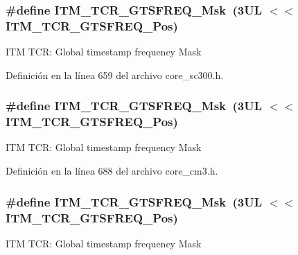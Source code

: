 \subsubsection[{\texorpdfstring{I\+T\+M\+\_\+\+T\+C\+R\+\_\+\+G\+T\+S\+F\+R\+E\+Q\+\_\+\+Msk}{ITM_TCR_GTSFREQ_Msk}}]{\setlength{\rightskip}{0pt plus 5cm}\#define I\+T\+M\+\_\+\+T\+C\+R\+\_\+\+G\+T\+S\+F\+R\+E\+Q\+\_\+\+Msk~(3\+U\+L $<$$<$ I\+T\+M\+\_\+\+T\+C\+R\+\_\+\+G\+T\+S\+F\+R\+E\+Q\+\_\+\+Pos)}\hypertarget{group___c_m_s_i_s___i_t_m_gade862cf009827f7f6748fc44c541b067}{}\label{group___c_m_s_i_s___i_t_m_gade862cf009827f7f6748fc44c541b067}
I\+TM T\+CR\+: Global timestamp frequency Mask 

Definición en la línea 659 del archivo core\+\_\+sc300.\+h.

\subsubsection[{\texorpdfstring{I\+T\+M\+\_\+\+T\+C\+R\+\_\+\+G\+T\+S\+F\+R\+E\+Q\+\_\+\+Msk}{ITM_TCR_GTSFREQ_Msk}}]{\setlength{\rightskip}{0pt plus 5cm}\#define I\+T\+M\+\_\+\+T\+C\+R\+\_\+\+G\+T\+S\+F\+R\+E\+Q\+\_\+\+Msk~(3\+U\+L $<$$<$ I\+T\+M\+\_\+\+T\+C\+R\+\_\+\+G\+T\+S\+F\+R\+E\+Q\+\_\+\+Pos)}\hypertarget{group___c_m_s_i_s___i_t_m_gade862cf009827f7f6748fc44c541b067}{}\label{group___c_m_s_i_s___i_t_m_gade862cf009827f7f6748fc44c541b067}
I\+TM T\+CR\+: Global timestamp frequency Mask 

Definición en la línea 688 del archivo core\+\_\+cm3.\+h.

\subsubsection[{\texorpdfstring{I\+T\+M\+\_\+\+T\+C\+R\+\_\+\+G\+T\+S\+F\+R\+E\+Q\+\_\+\+Msk}{ITM_TCR_GTSFREQ_Msk}}]{\setlength{\rightskip}{0pt plus 5cm}\#define I\+T\+M\+\_\+\+T\+C\+R\+\_\+\+G\+T\+S\+F\+R\+E\+Q\+\_\+\+Msk~(3\+U\+L $<$$<$ I\+T\+M\+\_\+\+T\+C\+R\+\_\+\+G\+T\+S\+F\+R\+E\+Q\+\_\+\+Pos)}\hypertarget{group___c_m_s_i_s___i_t_m_gade862cf009827f7f6748fc44c541b067}{}\label{group___c_m_s_i_s___i_t_m_gade862cf009827f7f6748fc44c541b067}
I\+TM T\+CR\+: Global timestamp frequency Mask 

